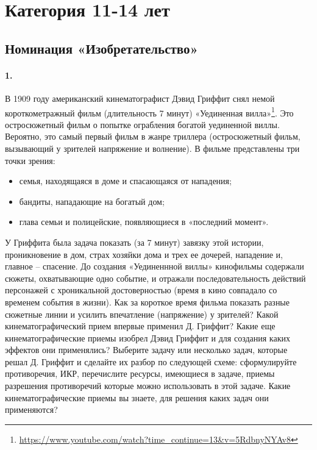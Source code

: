 \documentclass[11pt,a4paper]{article}
\begin{document}
\clearpage
\section{Категория 11-14 лет}

\subsection*{Номинация «Изобретательство»}

\paragraph{1.}
В 1909 году американский кинематографист Дэвид Гриффит снял немой
короткометражный фильм (длительность 7 минут) «Уединенная
вилла»\footnote{\url{https://www.youtube.com/watch?time_continue=13&v=5RdbnyNYAv8}}. Это
остросюжетный фильм о попытке ограбления богатой уединенной виллы. Вероятно,
это самый первый фильм в жанре триллера (остросюжетный фильм, вызывающий у
зрителей напряжение и волнение). В фильме представлены три точки зрения:
\begin{itemize}
  \item семья, находящаяся в доме и спасающаяся от нападения;
  \item бандиты, нападающие на богатый дом;
  \item глава семьи и полицейские, появляющиеся в «последний момент».
\end{itemize}
У Гриффита была задача показать (за 7 минут) завязку этой истории,
проникновение в дом, страх хозяйки дома и трех ее дочерей, нападение и,
главное – спасение. До создания «Уединеннной виллы» кинофильмы содержали
сюжеты, охватывающие одно событие, и отражали последовательность действий
персонажей с хроникальной достоверностью (время в кино совпадало со временем
события в жизни). Как за короткое время фильма показать разные сюжетные линии
и усилить впечатление (напряжение) у зрителей? Какой кинематографический прием
впервые применил Д. Гриффит? Какие еще кинематографические приемы изобрел
Дэвид Гриффит и для создания каких эффектов они применялись? Выберите задачу
или несколько задач, которые решал Д. Гриффит и сделайте их разбор по
следующей схеме: сформулируйте противоречия, ИКР, перечислите ресурсы,
имеющиеся в задаче, приемы разрешения противоречий которые можно использовать
в этой задаче. Какие кинематографические приемы вы знаете, для решения каких
задач они применяются?
\end{document}
